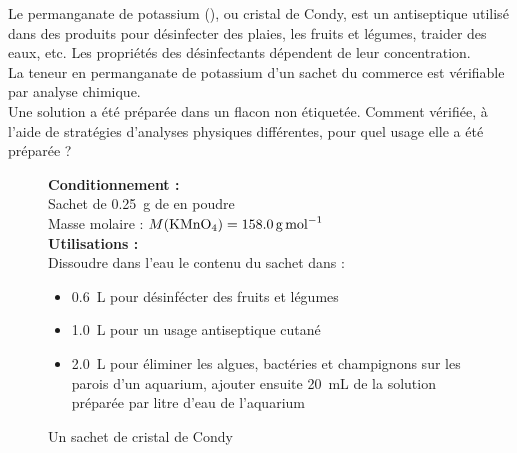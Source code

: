 \documentclass[a4paper,11pt,fleqn]{article}%
\begin{document}
\maketitle
Le permanganate de potassium (), ou cristal de Condy, est un antiseptique utilisé dans des produits pour désinfecter des plaies, les fruits et légumes, traider des eaux, etc. Les propriétés des désinfectants dépendent de leur concentration.\\
La teneur en permanganate de potassium d'un sachet du commerce est vérifiable par analyse chimique.\\
Une solution a été préparée dans un flacon non étiquetée. Comment vérifiée, à l'aide de stratégies d'analyses physiques différentes, pour quel usage elle a été préparée ?

\begin{figure}[h!]
    \begin{minipage}{.48\linewidth}
    \begin{minipage}{\linewidth}
        \caption{Un sachet de cristal de Condy}
        \textbf{Conditionnement :}\\
        Sachet de \SI{0,25}{\gram} de  en poudre\\
        Masse molaire : $M(\ce{KMnO4})= \SI{158,0}{\gram\per\mole}$\\

        \textbf{Utilisations :}\\
        Dissoudre dans l'eau le contenu du sachet dans : 
        \begin{itemize}
            \item \SI{0,6}{L} pour désinfécter des fruits et légumes
            \item \SI{1,0}{L} pour un usage antiseptique cutané
            \item \SI{2,0}{L} pour éliminer les algues, bactéries et champignons sur les parois d'un aquarium, ajouter ensuite \SI{20}{mL} de la solution préparée par litre d'eau de l'aquarium
        \end{itemize}
    \end{minipage}


\end{minipage}
\end{figure}
\end{document}
